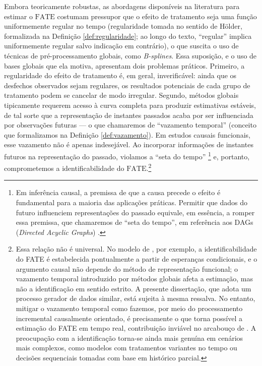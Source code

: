 Embora teoricamente robustas, as abordagens disponíveis na literatura para estimar o \(\mathrm{FATE}\) costumam pressupor que o efeito de tratamento seja uma função uniformemente regular no tempo (regularidade tomada no sentido de Hölder, formalizada na Definição \ref{def:regularidade}; ao longo do texto, ``regular'' implica uniformemente regular salvo indicação em contrário), o que suscita o uso de técnicas de pré-processamento globais, como \emph{B-splines}.
Essa suposição, e o uso de bases globais que ela motiva, apresentam dois problemas práticos.
Primeiro, a regularidade do efeito de tratamento é, em geral, inverificável: ainda que os desfechos observados sejam regulares, os resultados potenciais de cada grupo de tratamento podem se cancelar de modo irregular.
Segundo, métodos globais tipicamente requerem acesso à curva completa para produzir estimativas estáveis, de tal sorte que a representação de instantes passados acaba por ser influenciada por observações futuras --- o que chamaremos de ``vazamento temporal'' (conceito que formalizamos na Definição \ref{def:vazamento}).
Em estudos causais funcionais, esse vazamento não é apenas indesejável. Ao incorporar informações de instantes futuros na representação do passado, violamos a ``seta do tempo'' \footnote{Em inferência causal, a premissa de que a causa precede o efeito é fundamental para a maioria das aplicações práticas. Permitir que dados do futuro influenciem representações do passado equivale, em essência, a romper essa premissa, que chamaremos de “seta do tempo”, em referência aos DAGs (\emph{Directed Acyclic Graphs}) \cite{pearlCausalDiagramsEmpirical1995}.} e, portanto, comprometemos a identificabilidade do \(\mathrm{FATE}\).\footnote{Essa relação não é universal. No modelo de , por exemplo, a identificabilidade do FATE é estabelecida pontualmente a partir de esperanças condicionais, e o argumento causal não depende do método de representação funcional; o vazamento temporal introduzido por métodos globais afeta a estimação, mas não a identificação em sentido estrito. A presente dissertação, que adota um processo gerador de dados similar, está sujeita à mesma ressalva. No entanto, mitigar o vazamento temporal como fazemos, por meio do processamento incremental causalmente orientado, é precisamente o que torna possível a estimação do FATE em tempo real, contribuição inviável no arcabouço de . A preocupação com a identificação torna-se ainda mais genuína em cenários mais complexos, como modelos com tratamentos variantes no tempo ou decisões sequenciais tomadas com base em histórico parcial.}

